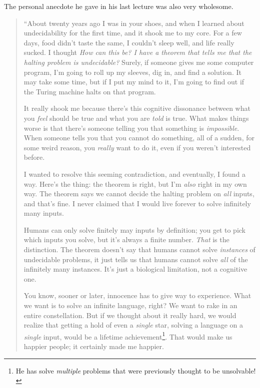 \documentclass[11pt]{article}
\renewcommand{\it}[1]{\textit{{#1}}}
\begin{document}
The personal anecdote he gave in his last lecture was also very wholesome.
\begin{quote}
  ``About twenty years ago I was in your shoes, and when I learned about
  undecidability for the first time, and it shook me to my core. For a few days,
  food didn't taste the same, I couldn't sleep well, and life really sucked. I
  thought \it{How can this be? I have a theorem that tells me that the halting
  problem is undecidable?} Surely, if someone gives me some computer program,
  I'm going to roll up my sleeves, dig in, and find a solution. It may take some
  time, but if I put my mind to it, I'm going to find out if the Turing machine
  halts on that program.
  \vspace{1em}

  It really shook me because there's this cognitive dissonance between what you
  \it{feel} should be true and what you are \it{told} is true. What makes things
  worse is that there's someone telling you that something is \it{impossible}.
  When someone tells you that you cannot do something, all of a sudden, for some
  weird reason, you \it{really} want to do it, even if you weren't interested
  before.
  \vspace{1em}

  I wanted to resolve this seeming contradiction, and eventually, I found a way.
  Here's the thing: the theorem is right, but I'm \it{also} right in my own way.
  The theorem says we cannot decide the halting problem on \it{all} inputs, and
  that's fine. I never claimed that I would live forever to solve infinitely many
  inputs.
  \vspace{1em}

  Humans can only solve finitely may inputs by definition; you get to pick
  which inputs you solve, but it's always a finite number. \it{That} is the
  distinction. The theorem doesn't say that humans cannot solve \it{instances} of
  undecidable problems, it just tells us that humans cannot solve \it{all} of the
  infinitely many instances. It's just a biological limitation, not a cognitive
  one.
  \vspace{1em}

  You know, sooner or later, innocence has to give way to experience. What we
  want is to solve an infinite language, right? We want to rake in an entire
  constellation. But if we thought about it really hard, we would realize that
  getting a hold of even a \it{single} star, solving a language on a \it{single}
  input, would be a lifetime achievement\footnote{He has solve \it{multiple}
  problems that were previously thought to be unsolvable!}. That would make us
  happier people; it certainly made me happier.
  \vspace{1em}


\end{quote}
\end{document}

